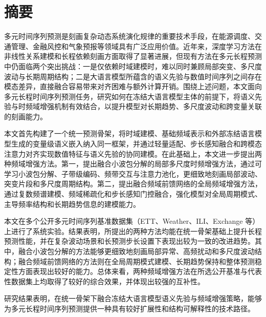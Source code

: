 \chapter{摘\quad 要}
\linespread{1.5}
 多元时间序列预测是刻画复杂动态系统演化规律的重要技术手段，在能源调度、交通管理、金融风控和气象预报等领域具有广泛应用价值。近年来，深度学习方法在非线性关系建模和长程依赖刻画方面取得了显著进展，但现有方法在多元长程预测中仍面临两个突出挑战：一是仅依赖时域建模时，难以同时兼顾局部突变、多尺度波动与长期周期结构；二是大语言模型所蕴含的语义先验与数值时间序列之间存在模态差异，直接融合容易带来对齐困难与额外计算开销。围绕上述问题，本文面向多元长程时间序列预测任务，研究如何在冻结大语言模型主体的前提下，将语义先验与时频域增强机制有效结合，以提升模型对长期趋势、多尺度波动和跨变量关联的刻画能力。

本文首先构建了一个统一预测骨架，将时域建模、基础频域表示和外部冻结语言模型生成的变量级语义嵌入纳入同一框架，并通过轻量适配、步长感知融合和跨模态注意力对齐实现数值特征与语义先验的协同建模。在此基础上，本文进一步提出两种频域增强方法。第一，提出融合小波包分解的局部多尺度时频增强方法，通过可学习小波包分解、子带级编码、频带交互与注意力池化，更细致地刻画局部波动、突变片段和多尺度周期结构。第二，提出融合频域前馈网络的全局频域增强方法，通过复数频谱建模、频域稀疏化和步长感知门控融合，强化模型对全局周期模式、主导频率结构和长期趋势信息的建模能力。

本文在多个公开多元时间序列基准数据集（ETT、Weather、ILI、Exchange 等）上进行了系统实验。结果表明，所提出的两种方法均能在统一骨架基础上提升长程预测性能，并在复杂波动场景和长预测步长设置下表现出较为一致的改进趋势。其中，融合小波包分解的方法能够更细致地刻画局部异常、高频扰动和多尺度波动结构；融合频域前馈网络的方法则在全局周期模式建模、长期趋势保持和整体预测稳定性方面表现出较好的能力。总体来看，两种频域增强方法在所选公开基准与代表性数据集上均取得了较好的综合效果，并体现出较强的互补性。

研究结果表明，在统一骨架下融合冻结大语言模型语义先验与频域增强策略，能够为多元长程时间序列预测提供一种具有较好扩展性和结构可解释性的技术路径。

